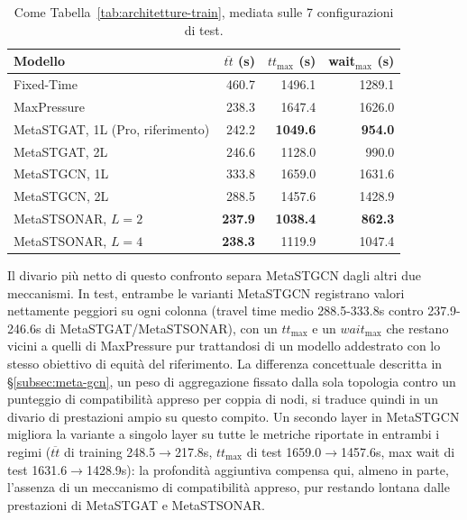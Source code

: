 \begin{table}[htbp]
  \centering
  \begin{tabular}{@{}lrrr@{}}
    \toprule
    Modello                          & $\overline{tt}$ (s) & $tt_{\max}$ (s) & wait$_{\max}$ (s) \\
    \midrule
    Fixed-Time                       & 460.7               & 1496.1          & 1289.1            \\
    MaxPressure                      & 238.3               & 1647.4          & 1626.0            \\
    MetaSTGAT, 1L (Pro, riferimento) & 242.2               & \textbf{1049.6} & \textbf{954.0}    \\
    MetaSTGAT, 2L                    & 246.6               & 1128.0          & 990.0             \\
    MetaSTGCN, 1L                    & 333.8               & 1659.0          & 1631.6            \\
    MetaSTGCN, 2L                    & 288.5               & 1457.6          & 1428.9            \\
    MetaSTSONAR, $L{=}2$             & \textbf{237.9}      & \textbf{1038.4} & \textbf{862.3}    \\
    MetaSTSONAR, $L{=}4$             & \textbf{238.3}      & 1119.9          & 1047.4            \\
    \bottomrule
  \end{tabular}
  \caption{Come Tabella~\ref{tab:architetture-train}, mediata sulle 7
    configurazioni di test.}
  \label{tab:architetture-test}
\end{table}

Il divario più netto di questo confronto separa MetaSTGCN dagli altri due
meccanismi. In test, entrambe le varianti
MetaSTGCN registrano valori nettamente peggiori su ogni colonna (travel time medio
288.5-333.8s contro 237.9-246.6s di MetaSTGAT/MetaSTSONAR), con un
$tt_{\max}$ e un $wait_{\max}$ che restano vicini a quelli di MaxPressure pur
trattandosi di un modello addestrato con lo stesso obiettivo di equità del
riferimento. La differenza concettuale descritta in §\ref{subsec:meta-gcn},
un peso di aggregazione fissato dalla sola topologia contro un punteggio di
compatibilità appreso per coppia di nodi, si traduce quindi in un divario di
prestazioni ampio su questo compito.
Un secondo layer in MetaSTGCN
migliora la variante a singolo layer su tutte le metriche riportate in
entrambi i regimi ($\overline{tt}$ di training 248.5$\to$217.8s,
$tt_{\max}$ di test 1659.0$\to$1457.6s, max wait di test
1631.6$\to$1428.9s): la profondità aggiuntiva compensa qui, almeno in
parte, l'assenza di un meccanismo di compatibilità appreso, pur restando
lontana dalle prestazioni di MetaSTGAT e MetaSTSONAR.

